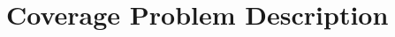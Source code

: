 \documentclass{article}
\newcommand{\ph}[1]{{\textbf{#1}:}} %
\begin{document}





\section{Coverage Problem Description}







\end{document}
